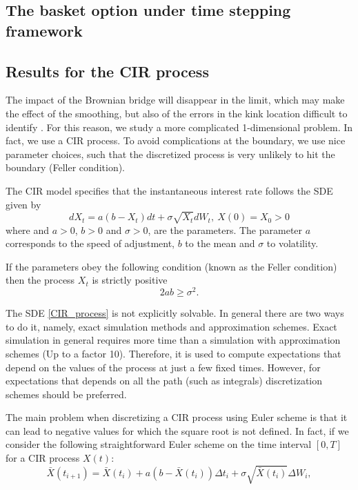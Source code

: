 \documentclass[11pt]{article}
\begin{document}
\FloatBarrier

\subsection{The basket option under time stepping framework}\label{sec:The basket option under time stepping framework}


\FloatBarrier

\subsection{Results for  the CIR process}

The impact of the Brownian bridge will disappear in the limit, which may make the effect of the smoothing, but also of the errors in the kink location difficult to identify . For this reason, we study a more complicated 1-dimensional problem. In fact, we use a CIR process. To avoid complications at the boundary, we use nice parameter choices, such that the discretized process is very unlikely to hit the boundary (Feller condition).



The CIR model specifies that the instantaneous interest rate follows the SDE given by
\begin{equation}\label{CIR_process}
dX_t=a(b-X_t)dt+\sigma \sqrt{X_t} dW_t,\: X(0)=X_0>0
\end{equation}
where and $a>0$, $b>0$ and $\sigma>0$, are the parameters. The parameter $a$ corresponds to the speed of adjustment, $b$ to the mean and $\sigma$ to volatility. 

If the parameters obey the following condition (known as the Feller condition) then the process $X_t$  is strictly positive
\begin{equation}\label{Feller_condition}
2 a b \geq\sigma^2.
\end{equation}

The SDE \eqref{CIR_process} is not explicitly solvable. In general there are two ways to do it, namely, exact simulation methods and approximation schemes. Exact simulation in general requires more time
than a simulation with approximation schemes (Up to a factor 10). Therefore, it is used to compute expectations that depend on the values of the process at just a few fixed times. However, for expectations that depends on all the path (such as integrals) discretization schemes should be preferred. 

The main problem  when discretizing a CIR process using Euler scheme is that it can lead to negative values for which the square root is not defined. In fact, if we consider the following straightforward Euler scheme on the time interval $[0,T]$ for a CIR process $X(t)$:
\begin{equation}\label{Euler_CIR}
\bar{X}(t_{i+1})=\bar{X}(t_i)+a(b-\bar{X}(t_i)) \Delta t_i+\sigma \sqrt{\bar{X}(t_i)} \Delta W_i,
\end{equation}
\end{document}
